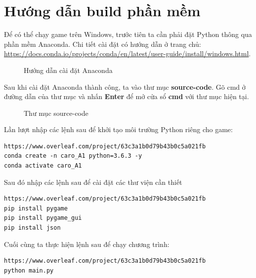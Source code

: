 \section{Hướng dẫn build phần mềm}
Để có thể chạy game trên Windows, trước tiên ta cần phải đặt Python thông qua phần mềm Anaconda. Chi tiết cài đặt có hướng dẫn ở trang chủ: \url{https://docs.conda.io/projects/conda/en/latest/user-guide/install/windows.html}.
\begin{figure}[H]
\caption{Hướng dẫn cài đặt Anaconda}
\end{figure}
Sau khi cài đặt Anaconda thành công, ta vào thư mục \textbf{source-code}. Gõ cmd ở đường dẫn của thư mục và nhấn \textbf{Enter} để mở cửa sổ \textbf{cmd} với thư mục hiện tại.
\begin{figure}[H]
\caption{Thư mục source-code}
\end{figure}
Lần lượt nhập các lệnh sau để khởi tạo môi trường Python riêng cho game:
\begin{lstlisting}https://www.overleaf.com/project/63c3a1b0d79b43b0c5a021fb
conda create -n caro_A1 python=3.6.3 -y
conda activate caro_A1
\end{lstlisting}

Sau đó nhập các lệnh sau để cài đặt các thư viện cần thiết
\begin{lstlisting}https://www.overleaf.com/project/63c3a1b0d79b43b0c5a021fb
pip install pygame
pip install pygame_gui
pip install json
\end{lstlisting}

Cuối cùng ta thực hiện lệnh sau để chạy chương trình:
\begin{lstlisting}https://www.overleaf.com/project/63c3a1b0d79b43b0c5a021fb
python main.py
\end{lstlisting}